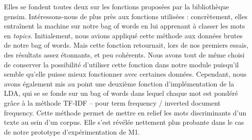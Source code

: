 \documentclass[letterpaper,portrait,12pt]{article}
\begin{document}
\textcolor[rgb]{0.000,0.000,0.000}{Elles se fondent toutes deux sur les fonctions propos\'{e}es par la biblioth\`{e}que gensim. Int\'{e}ressons-nous de plus pr\`{e}s aux fonctions utilis\'{e}es : concr\`{e}tement, elles entra\^{i}nent la machine sur notre bag of words en lui apprenant \`{a} classer les mots en }\emph{\textcolor[rgb]{0.000,0.000,0.000}{topics}}\textcolor[rgb]{0.000,0.000,0.000}{. Initialement, nous avions appliqu\'{e} cette m\'{e}thode aux donn\'{e}es brutes de notre bag of words. Mais cette fonction retournait, lors de nos premiers essais, des r\'{e}sultats assez \'{e}tonnants, et peu coh\'{e}rents. Nous avons tout de m\^{e}me choisi de conserver la possibilit\'{e} d'utiliser cette fonction dans notre module puisqu'il semble qu'elle puisse mieux fonctionner avec certaines donn\'{e}es. Cependant, nous avons \'{e}galement mis au point une deuxi\`{e}me fonction d'impl\'{e}mentation de la LDA, qui se se fonde sur un bag of words dans lequel chaque mot est pond\'{e}r\'{e} gr\^{a}ce \`{a} la m\'{e}thode TF-IDF -- pour term frequency / inverted document frequency. Cette m\'{e}thode permet de mettre en relief les mots discriminants d'un texte au sein d'un corpus. Elle s'est r\'{e}v\'{e}l\'{e}e nettement plus probante dans le cas de notre prototype d'exp\'{e}rimentation de M1.}
\end{document}
